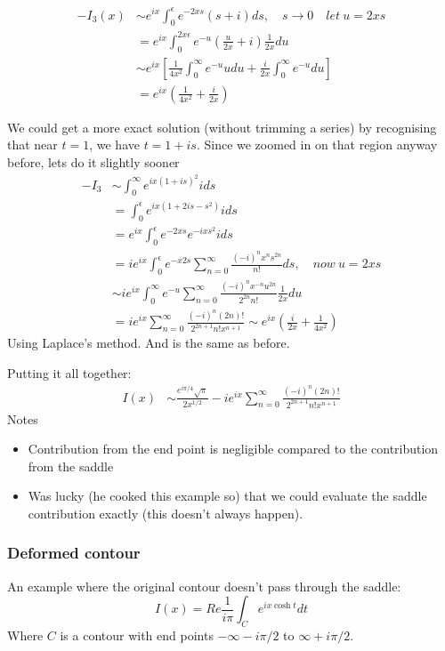 \documentclass{X:/Documents/Coding/Latex/myassignment}
\begin{document}
\begin{align*}
    -I_3(x)& \sim e^{ix} \int_0^\epsilon e^{-2xs}(s+i) ds, \quad s\to 0 \quad let \ u =2xs\\
    &= e^{ix}\int_0^{2x\epsilon} e^{-u} \left(\frac{u}{2x} + i\right) \frac{1}{2x}du\\
    &\sim e^{ix} \left[\frac{1}{4x^2} \int_0^\infty e^{-u}u du + \frac{i}{2x} \int_0^\infty e^{-u}du\right]\\
    &= e^{ix} \left(\frac{1}{4x^2} + \frac{i}{2x}\right)
\end{align*}

We could get a more exact solution  (without trimming a series) by recognising that near $t=1$, we have $t = 1+is$. Since we zoomed in on that region anyway before, lets do it slightly sooner
\begin{align*}
    -I_3 &\sim \int_0^\infty e^{ix(1+is)^2}i ds\\
    &=\int_0^\epsilon e^{ix(1+2is - s^2)} ids\\
    &= e^{ix} \int_0^\epsilon e^{-2xs} e^{-ixs^2}ids\\
    &= ie^{ix} \int_0^\epsilon e^{-x2s} \sum_{n=0}^\infty \frac{(-i)^n x^n s^{2n}}{n!} ds, \quad now \ u = 2xs\\
    &\sim ie^{ix} \int_0^\infty e^{-u} \sum_{n=0}^\infty \frac{(-i)^n x^{-n} u^{2n}}{2^{2n}n!} \frac{1}{2x}du\\
    &= ie^{ix} \sum_{n=0}^\infty \frac{(-i)^n (2n)!}{2^{2n+1}n! x^{n+1}}\sim e^{ix}\left(\frac{i}{2x}+ \frac{1}{4x^2} \right)
\end{align*}
Using Laplace's method. And is the same as before.

Putting it all together:
\begin{align*}
    I(x) &\sim \frac{e^{i\pi/4}\sqrt{\pi}}{2x^{1/2}} - ie^{ix} \sum_{n=0}^\infty \frac{(-i)^n(2n)!}{2^{2n+1}n! x^{n+1}}
\end{align*}
Notes
\begin{itemize}
    \item Contribution from the end point is negligible compared to the contribution from the saddle
    \item Was lucky (he cooked this example so) that we could evaluate the saddle contribution exactly (this doesn't always happen).
\end{itemize}


\subsubsection{Deformed contour}
An example where the original contour doesn't pass through the saddle:
\[I(x) = Re\frac{1}{i\pi} \int_C e^{ix\cosh t} dt\]
Where $C$ is a contour with end points $-\infty -i\pi/2$ to $\infty + i\pi/2$.
\end{document}
